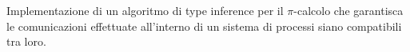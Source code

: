 \noindent
\centering

Implementazione di un algoritmo di type inference per il $\pi$-calcolo che
garantisca le comunicazioni effettuate all'interno di un sistema di processi
siano compatibili tra loro.
